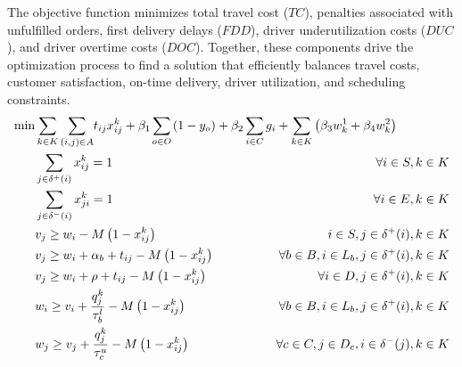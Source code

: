 \documentclass[]{article}
\begin{document}
The objective function minimizes total travel cost ($TC$), penalties associated with unfulfilled orders, first delivery delays ($FDD$), driver underutilization costs ($DUC$), and driver overtime costs ($DOC$). Together, these components drive the optimization process to find a solution that efficiently balances travel costs, customer satisfaction, on-time delivery, driver utilization, and scheduling constraints.
{
\small
\begin{alignat}{3}
    \label{mod:obj}   \min & \sum_{k \in K}{{ \sum_{ \substack{(i,j) \in A} }} {t_{ij}x^{k}_{ij}}} + \beta_1\smashoperator{\sum_{ o \in O}}{  \left(1-y_o\right)} \hspace{-0mm}  + \beta_2 \smashoperator{ \sum_{i \in C } } { g_i  } +  \sum_{k \in K}\left({\beta_3 w^{1}_k  + \beta_4  w^{2}_k}\right) &                             \\
    \label{mod:c1}         & \sum_{j \in \delta^{+}(i) }{x^k_{ij}} =1   & \hspace{-10mm}  \forall i \in S, k \in K   \\
    \label{mod:c2}         & \sum_{j \in \delta^{-}(i)}{x^k_{ji}} = 1     & \hspace{-10mm} \forall i \in E, k \in K\\
    \label{mod:c03}        & v_j \geq  w_i  - M\left(1-x^{k}_{ij}\right)   & \hspace{-30mm}  i \in S, j \in \delta^{+}(i),  k \in K      \\
    \label{mod:c3}         & v_j \geq  w_i + \alpha_{b} + t_{ij} - M\left(1-x^{k}_{ij}\right) & \hspace{-40mm} \forall b \in B, i \in L_b, j \in \delta^{+}(i),  k \in K     \\
    \label{mod:c4}         & v_j \geq  w_i + \rho + t_{ij} - M\left(1-x^{k}_{ij}\right)                                                                       & \hspace{-40mm} \forall i \in D  , j \in \delta^{+}(i), k \in K                         \\
    \label{mod:c5}         & w_{i} \geq v_{i}  + \frac{q^k_j}{\tau^l_b} -M\left(1- x^{k}_{ij}\right)   & \hspace{-40mm} \forall  b \in B,  i \in L_{b},  j \in \delta^{+}(i), k \in K \\
    \label{mod:c6}         & w_{j} \geq v_{j}  + {  \frac{q^k_j}{\tau^u_c} -M\left(1- x^{k}_{ij}\right) }     & \hspace{-40mm}  \forall c \in  C, j \in D_{c}, i \in \delta^{-}(j),  k \in K \\

\end{alignat}}
\end{document}
